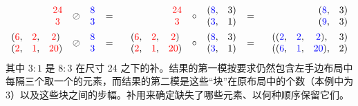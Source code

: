 \begin{align*}
\begin{array}{c} \textcolor{red}{24} \\ \textcolor{red}{3} \end{array}
\ \oslash \
\begin{array}{c} \textcolor{blue}{8} \\ \textcolor{blue}{3} \end{array}
\ &=& \
\begin{array}{c} \textcolor{red}{24} \\ \textcolor{red}{3} \end{array}
\ \circ \
\begin{array}{cc} (\textcolor{blue}{8}, & 3) \\ (\textcolor{blue}{3}, & 1) \end{array}
\ &=& \
\begin{array}{cc} (\textcolor{blue}{8}, & 3) \\ (\textcolor{blue}{9}, & 3) \end{array} \\
\begin{array}{ccc} (\textcolor{red}{6}, & \textcolor{red}{2}, & \textcolor{red}{2}) \\ (\textcolor{red}{2}, & \textcolor{red}{1}, & \textcolor{red}{20}) \end{array}
\ \oslash \
\begin{array}{c} \textcolor{blue}{8} \\ \textcolor{blue}{3} \end{array}
\ &=& \
\begin{array}{ccc} (\textcolor{red}{6}, & \textcolor{red}{2}, & \textcolor{red}{2}) \\ (\textcolor{red}{2}, & \textcolor{red}{1}, & \textcolor{red}{20}) \end{array}
\ \circ \
\begin{array}{cc} (\textcolor{blue}{8}, & 3) \\ (\textcolor{blue}{3}, & 1) \end{array}
\ &=& \
\begin{array}{cccc} ((\textcolor{blue}{2}, & \textcolor{blue}{2}, & \textcolor{blue}{2}), & 3) \\ ((\textcolor{blue}{6}, & \textcolor{blue}{1}, & \textcolor{blue}{20}), & 2) \end{array}
\end{align*}
其中 $3:1$ 是 $8:3$ 在尺寸 24 之下的补。结果的第一模按要求仍然包含左手边布局中每隔三个取一个的元素，而结果的第二模是这些“块”在原布局中的个数（本例中为 3）以及这些块之间的步幅。补用来确定缺失了哪些元素、以何种顺序保留它们。

